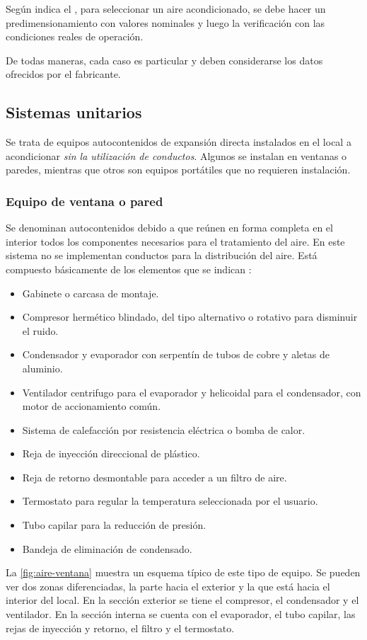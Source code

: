 Según indica el , para seleccionar un aire acondicionado, se debe hacer un predimensionamiento con valores nominales y luego la verificación con las condiciones reales de operación.

De todas maneras, cada caso es particular y deben considerarse los datos ofrecidos por el fabricante.

\subsection{Sistemas unitarios}
Se trata de equipos autocontenidos de expansión directa instalados en el local a acondicionar \emph{sin la utilización de conductos}. Algunos se instalan en ventanas o paredes, mientras que otros son equipos portátiles que no requieren instalación.

\subsubsection{Equipo de ventana o pared}

Se denominan autocontenidos debido a que reúnen en forma completa en el interior todos los componentes necesarios para el tratamiento del aire. En este sistema no se implementan conductos para la distribución del aire. Está compuesto básicamente de los elementos que se indican \parencite{quadri2021sistemas}:
\begin{itemize}
	\item Gabinete o carcasa de montaje.
	\item Compresor hermético blindado, del tipo alternativo o rotativo para disminuir el ruido.
	\item Condensador y evaporador con serpentín de tubos de cobre y aletas de aluminio.
	\item Ventilador centrifugo para el evaporador y helicoidal para el condensador, con motor de accionamiento común.
	\item Sistema de calefacción por resistencia eléctrica o bomba de calor.
	\item Reja de inyección direccional de plástico.
	\item Reja de retorno desmontable para acceder a un filtro de aire.
	\item Termostato para regular la temperatura seleccionada por el usuario.
	\item Tubo capilar para la reducción de presión.
	\item Bandeja de eliminación de condensado.
\end{itemize}
La \autoref{fig:aire-ventana} muestra un esquema típico de este tipo de equipo. Se pueden ver dos zonas diferenciadas, la parte hacia el exterior y la que está hacia el interior del local. En la sección exterior se tiene el compresor, el condensador y el ventilador. En la sección interna se cuenta con el evaporador, el tubo capilar, las rejas de inyección y retorno, el filtro y el termostato.


